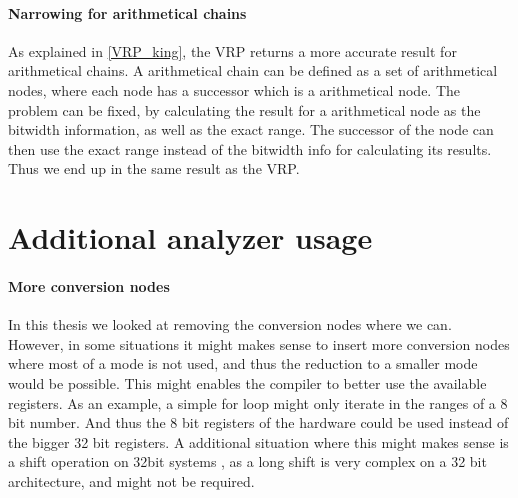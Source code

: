 \paragraph{Narrowing for arithmetical chains}
As explained in \ref{VRP_king}, the VRP returns a more accurate result for arithmetical chains. A arithmetical chain can be defined as a set of arithmetical nodes, where each node has a successor which is a arithmetical node.
The problem can be fixed, by calculating the result for a arithmetical node as the bitwidth information, as well as the exact range. The successor of the node can then use the exact range instead of the bitwidth info for calculating its results. Thus we end up in the same result as the VRP.

\section{Additional analyzer usage}
\paragraph{More conversion nodes}
In this thesis we looked at removing the conversion nodes where we can. However, in some situations it might makes sense to insert more conversion nodes where most of a mode is not used, and thus the reduction to a smaller mode would be possible. This might enables the compiler to better use the available registers. As an example, a simple for loop might only iterate in the ranges of a 8 bit number. And thus the 8 bit registers of the hardware could be used instead of the bigger 32 bit registers. A additional situation where this might makes sense is a shift operation on 32bit systems , as a long shift is very complex on a 32 bit architecture, and might not be required.